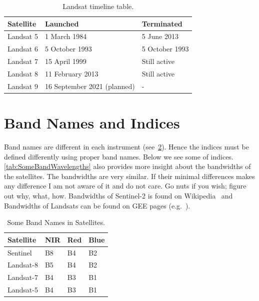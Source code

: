 \documentclass{article}
\begin{document}
\begin{table}[]
\centering
\caption{Landsat timeline table.} 
\label{tab:ElevationTable}
\begin{tabular}{|l|l|l|}
\hline
\rowcolor{shadecolor} 
\small{Satellite} & 
\small{Launched} & 
\small{Terminated} \\
\hline
Landsat 5 & 1 March 1984 & 5 June 2013 \\ 
\hline
\rowcolor{aliceblue} 
Landsat 6 & 5 October 1993  & 5 October 1993 \\ \hline
Landsat 7 & 15 April 1999 & Still active \\ \hline
\rowcolor{aliceblue} 
Landsat 8 & 11 February 2013 & Still active \\ \hline
Landsat 9 & 16 September 2021 (planned) & - \\ \hline
\end{tabular}
\end{table}

\section{Band Names and Indices}
\label{sec:Band_Names_and_Indices}

Band names are different in each instrument
(see~\cref{tab:BandNameTable}).
Hence the indices must be defined differently
using proper band names.
Below we see some of indices.
\cref{tab:SomeBandWavelengths} also provides
more insight about the bandwidths of the satellites.
The bandwidths are very similar. If their
minimal differences makes any difference I am not aware of it and do not care. 
Go nuts if you wish; figure out why, what, how.
Bandwidths of Sentinel-2 is found on Wikipedia~\cite{SentinelBandwidths}
and Bandwidths of Landsats can be found on GEE pages (e.g.~\cite{Landsat7T1SRBandWidths}).

\begin{table}[]
\centering
\caption{Some Band Names in Satellites.} 
\label{tab:BandNameTable}
\begin{tabular}{|l|l|l|l|}
\hline
\rowcolor{shadecolor} 
\small{Satellite} & 
\small{NIR} & 
\small{Red}  &
\small{Blue} \\
\hline
Sentinel & B8 & B4 & B2\\ 
\hline
\rowcolor{aliceblue} 
Landsat-8 & B5 & B4 & B2\\ 
\hline
Landsat-7 & B4 & B3 & B1\\ 
\hline
\rowcolor{aliceblue} 
Landsat-5 & B4 & B3 & B1\\ 
\hline
\end{tabular}
\end{table}
\end{document}
